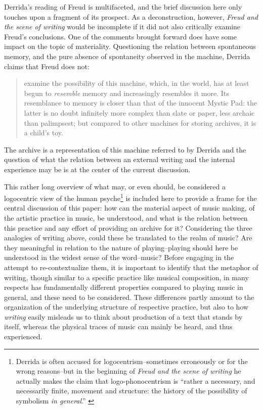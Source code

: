 \documentclass[11pt,a4paper]{article}
\begin{document}
Derrida's reading of Freud is multifaceted, and the brief discussion here only touches upon a fragment of its prospect. As a deconstruction, however, \emph{Freud and the scene of writing} would be incomplete if it did not also critically examine Freud's conclusions.
One of the comments brought forward does have some impact on the topic of materiality.
Questioning the relation between spontaneous memory, and the pure absence of spontaneity observed in the machine, Derrida claims that Freud does not:
\begin{quote}
examine the possibility of this machine, which, in the world, has at least begun to \emph{resemble} memory and increasingly resembles it more. Its resemblance to memory is closer than that of the innocent Mystic Pad: the latter is no doubt infinitely more complex than slate or paper, less archaic than palimpsest; but compared to other machines for storing archives, it is a child's toy. \citep[286-7]{der78}
\end{quote}
 The archive is a representation of this machine referred to by Derrida and the question of what the relation between an external writing and the internal experience may be is at the center of the current discussion.

This rather long overview of what may, or even should, be considered a logocentric view of the human psyche\footnote{Derrida is often accused for logocentrism--sometimes erroneously or for the wrong reasons--but in the beginning of \emph{Freud and the scene of writing} he actually makes the claim that logo-phonocentrism is ``rather a necessary, and necessarily finite, movement and structure: the history of the possibility of symbolism \emph{in general}.'' \citep[p. 247]{der78}} is included here to provide a frame for the central discussion of this paper: how can the material aspect of music making, of the artistic practice in music, be understood, and what is the relation between this practice and any effort of providing an archive for it? Considering the three analogies of writing above, could these be translated to the realm of music? Are they meaningful in relation to the nature of playing--playing should here be understood in the widest sense of the word--music? Before engaging in the attempt to re-contextualize them, it is important to identify that the metaphor of writing, though similar to a specific practice like musical composition, in many respects has fundamentally different properties compared to playing music in general, and these need to be considered. These differences partly amount to the organization of the underlying structure of respective practice, but also to how \emph{writing} easily misleads us to think about production of a text that stands by itself, whereas the physical traces of music can mainly be heard, and thus experienced.
\end{document}
